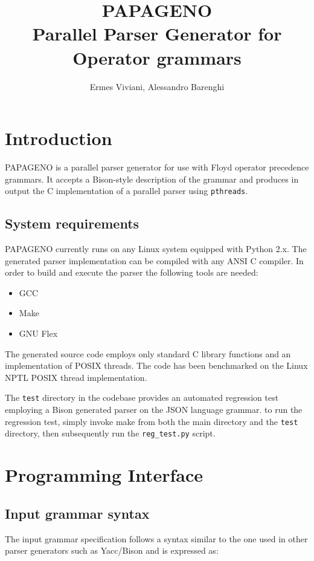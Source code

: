 \documentclass[a4paper,10pt]{article}
\title{PAPAGENO\\ Parallel Parser Generator for Operator grammars}
\author{Ermes Viviani, Alessandro Barenghi}
\begin{document}
\maketitle

\section{Introduction}
PAPAGENO is a parallel parser generator for use with Floyd operator precedence
grammars. It accepts a Bison-style description of the grammar and produces in 
output the C implementation of a parallel parser using \texttt{pthreads}.

\subsection{System requirements}

PAPAGENO currently runs on any Linux system equipped with Python 2.x.
The generated parser implementation can be compiled with any ANSI C compiler.
In order to build and execute the parser the following tools are needed:
\begin{itemize}
 \item GCC 
 \item Make
 \item GNU Flex
\end{itemize}

The generated source code employs only standard C library functions and an implementation of POSIX threads.
The code has been benchmarked on the Linux NPTL POSIX thread implementation.

The \texttt{test} directory in the codebase provides an automated regression test employing a Bison generated parser on the JSON language grammar.
to run the regression test, simply invoke make from both the main directory and the \texttt{test} directory, then subsequently run the \texttt{reg_test.py} script.


\section{Programming Interface}

\subsection{Input grammar syntax}

The input grammar specification follows a syntax similar to the one used in
other parser generators such as Yacc/Bison and is expressed as:
\end{document}
